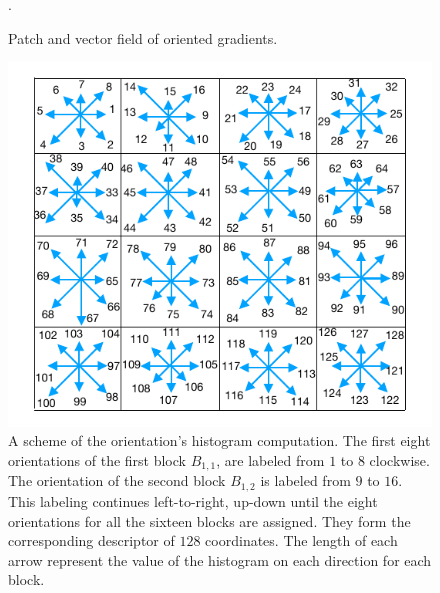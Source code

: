 \begin{figure}[h!]
\caption[Histogram of Gradient Orientations]{Patch and vector field of oriented gradients.}.
\label{fig:sampledescriptor}
\end{figure}


\begin{figure}[h!]
\centering
\includegraphics[width=16cm]{images/gradientorientations.pdf}
\caption[Gradient Orientations Numbering]{A scheme of the orientation's histogram computation. The first eight orientations of the first block $ B_{1,1} $, are labeled from $1$ to $8$ clockwise. The orientation of the second block $ B_{1,2} $ is labeled from $9$ to $16$.  This labeling continues left-to-right, up-down until the eight orientations for all the sixteen blocks are assigned. They form the corresponding descriptor of $128$ coordinates.  The length of each arrow represent the value of the histogram on each direction for each block.}
\label{fig:orientationsfull}
\end{figure}


